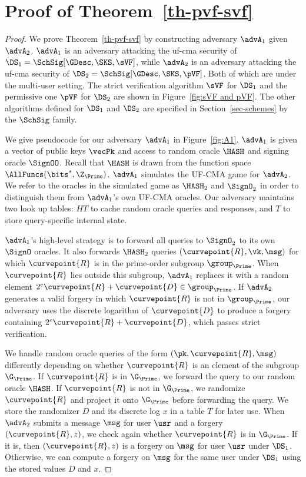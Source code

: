 \section{Proof of Theorem~\ref{th-pvf-svf}}\label{sec-pvf-svf}

	\begin{proof}
		
		We prove Theorem~\ref{th-pvf-svf} by constructing adversary $\advA_1$ given $\advA_2$.  $\advA_1$ is an adversary attacking the uf-cma security of $\DS_1= \SchSig[\GDesc,\SKS,\sVF]$, while $\advA_2$ is an adversary attacking the uf-cma security of $\DS_2= \SchSig[\GDesc,\SKS,\pVF]$. Both of which are under the multi-user setting. The strict verification algorithm $\sVF$ for $\DS_1$ and the permissive one $\pVF$ for  $\DS_2$ are shown in Figure~\ref{fig:sVF and pVF}. The other algorithms defined for $\DS_1$ and $\DS_2$ are specified in Section~\ref{sec-schemes} by the $\SchSig$ family.
		
		We give pseudocode for our adversary $\advA_1$ in Figure~\ref{fig:A1}. $\advA_1$ is given a vector of public keys $\vecPk$ and access to random oracle $\HASH$ and signing oracle $\SignOO$. Recall that $\HASH$ is drawn from the function space $\AllFuncs(\bits^*, \Z_{\Prime})$. $\advA_1$ simulates the UF-CMA game for $\advA_2$. We refer to the oracles in the simulated game as $\HASH_2$ and $\SignO_2$ in order to distinguish them from $\advA_1$'s own UF-CMA oracles. Our adversary maintains two look up tables: $HT$ to cache random oracle queries and responses, and $T$ to store query-specific internal state.
		
		$\advA_1$'s high-level strategy is to forward all queries to $\SignO_2$ to its own $\SignO$ oracles. It also forwards $\HASH_2$ queries $(\curvepoint{R}, \vk, \msg)$ for which $\curvepoint{R}$ is in the prime-order subgroup $\group_{\Prime}$. When $\curvepoint{R}$ lies outside this subgroup, $\advA_1$ replaces it with a random element $2^c\curvepoint{R}+\curvepoint{D} \in \group_{\Prime}$. If $\advA_2$ generates a valid forgery in which $\curvepoint{R}$ is not in $\group_{\Prime}$, our adversary uses the discrete logarithm of $\curvepoint{D}$ to produce a forgery containing $2^c\curvepoint{R}+\curvepoint{D}$, which passes strict verification. 
		
		We handle random oracle queries of the form $(\pk, \curvepoint{R}, \msg)$ differently depending on whether $\curvepoint{R}$ is an element of the subgroup $\G_\Prime$. If $\curvepoint{R}$ is in $\G_\Prime$, we forward the query to our random oracle $\HASH$. If $\curvepoint{R}$ is not in $\G_\Prime$, we randomize $\curvepoint{R}$ and project it onto $\G_\Prime$ before forwarding the query. We store the randomizer $D$ and its discrete log $x$ in a table $T$ for later use. When $\advA_2$ submits a message $\msg$ for user $\usr$ and a forgery $(\curvepoint{R}, z)$, we check again whether $\curvepoint{R}$ is in $\G_\Prime$. If it is, then $(\curvepoint{R}, z)$ is a forgery on $\msg$ for user $\usr$ under $\DS_1$. Otherwise, we can compute a forgery on $\msg$ for the same user under $\DS_1$ using the stored values $D$ and $x$.
		

\end{proof}
